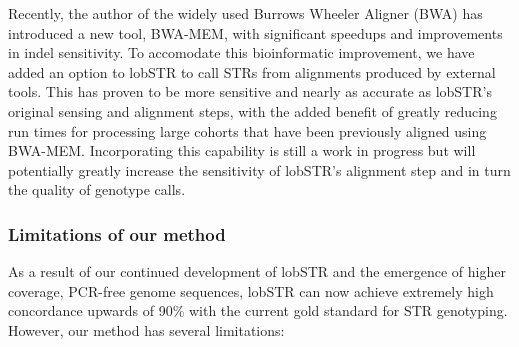 Recently, the author of the widely used Burrows Wheeler Aligner (BWA) \cite{LiDurbin2009a} has introduced a new tool, BWA-MEM, with significant speedups and improvements in indel sensitivity. To accomodate this bioinformatic improvement, we have added an option to lobSTR to call STRs from alignments produced by external tools. This has proven to be more sensitive and nearly as accurate as lobSTR's original sensing and alignment steps, with the added benefit of greatly reducing run times for processing large cohorts that have been previously aligned using BWA-MEM. Incorporating this capability is still a work in progress but will potentially greatly increase the sensitivity of lobSTR's alignment step and in turn the quality of genotype calls.

\subsubsection{Limitations of our method}
As a result of our continued development of lobSTR and the emergence of higher coverage, PCR-free genome sequences, lobSTR can now achieve extremely high concordance upwards of 90\% with the current gold standard for STR genotyping. However, our method has several limitations:

